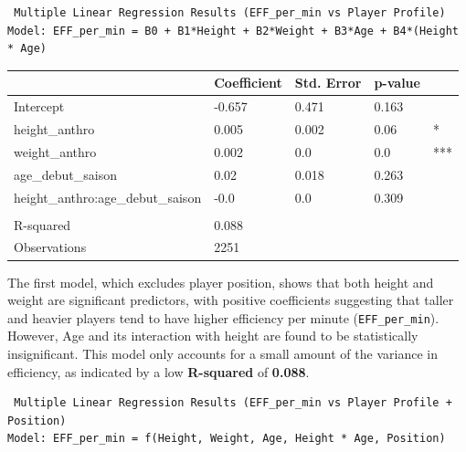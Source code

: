 \documentclass[
  letterpaper,
  DIV=11,
  numbers=noendperiod]{scrartcl}
\begin{document}
\begin{verbatim}
 Multiple Linear Regression Results (EFF_per_min vs Player Profile) 
Model: EFF_per_min = B0 + B1*Height + B2*Weight + B3*Age + B4*(Height * Age)
\end{verbatim}

\begin{longtable}[]{@{}lllll@{}}
\toprule\noalign{}
& Coefficient & Std. Error & p-value & \\
\midrule\noalign{}
\endhead
\bottomrule\noalign{}
\endlastfoot
Intercept & -0.657 & 0.471 & 0.163 & \\
height\_anthro & 0.005 & 0.002 & 0.06 & * \\
weight\_anthro & 0.002 & 0.0 & 0.0 & *** \\
age\_debut\_saison & 0.02 & 0.018 & 0.263 & \\
height\_anthro:age\_debut\_saison & -0.0 & 0.0 & 0.309 & \\
& & & & \\
R-squared & 0.088 & & & \\
Observations & 2251 & & & \\
\end{longtable}

The first model, which excludes player position, shows that both height
and weight are significant predictors, with positive coefficients
suggesting that taller and heavier players tend to have higher
efficiency per minute (\texttt{EFF\_per\_min}). However, Age and its
interaction with height are found to be statistically insignificant.
This model only accounts for a small amount of the variance in
efficiency, as indicated by a low \textbf{R-squared} of \textbf{0.088}.

\begin{verbatim}
 Multiple Linear Regression Results (EFF_per_min vs Player Profile + Position) 
Model: EFF_per_min = f(Height, Weight, Age, Height * Age, Position)
\end{verbatim}
\end{document}
